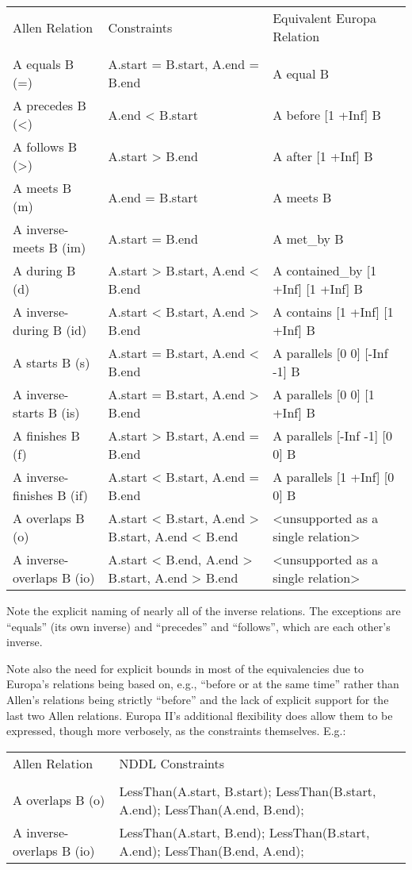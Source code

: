 \documentclass[10pt, letterpaper, twoside]{article}
\begin{document}
{\begin{tabular}{lll}
Allen Relation & Constraints & Equivalent Europa Relation \\
\cline{1-3} \\
A equals B (=) & A.start = B.start, A.end = B.end & A equal B \\
A precedes B (<) & A.end < B.start & A before [1 +Inf] B \\
A follows B (>) & A.start > B.end & A after [1 +Inf] B \\
A meets B (m) & A.end = B.start & A meets B \\
A inverse-meets B (im) & A.start = B.end & A met\_by B \\
A during B (d) & A.start > B.start, A.end < B.end & A contained\_by [1 +Inf] [1 +Inf] B \\
A inverse-during B (id) & A.start < B.start, A.end > B.end & A contains [1 +Inf] [1 +Inf] B \\
A starts B (s) & A.start = B.start, A.end < B.end & A parallels [0 0] [-Inf -1] B \\
A inverse-starts B (is) & A.start = B.start, A.end > B.end & A parallels [0 0] [1 +Inf] B \\
A finishes B (f) & A.start > B.start, A.end = B.end & A parallels [-Inf -1] [0 0] B \\
A inverse-finishes B (if) & A.start < B.start, A.end = B.end & A parallels [1 +Inf] [0 0] B \\
A overlaps B (o) & A.start < B.start, A.end > B.start, A.end < B.end & <unsupported as a single relation> \\
A inverse-overlaps B (io) & A.start < B.end, A.end > B.start, A.end > B.end & <unsupported as a single relation> \\
\end{tabular}

Note the explicit naming of nearly all of the inverse relations.
The exceptions are ``equals'' (its own inverse) and ``precedes'' and
``follows'', which are each other's inverse.

Note also the need for explicit bounds in most of the equivalencies
due to Europa's relations being based on, e.g., ``before or at the same
time'' rather than Allen's relations being strictly ``before'' and the
lack of explicit support for the last two Allen relations.  Europa
II's additional flexibility does allow them to be expressed, though
more verbosely, as the constraints themselves.  E.g.:

\begin{tabular}{ll}
Allen Relation & NDDL Constraints \\
\cline{1-2} \\
A overlaps B (o) & LessThan(A.start, B.start); LessThan(B.start, A.end); LessThan(A.end, B.end); \\
A inverse-overlaps B (io) & LessThan(A.start, B.end); LessThan(B.start, A.end); LessThan(B.end, A.end); \\
\end{tabular}

}
\end{document}
